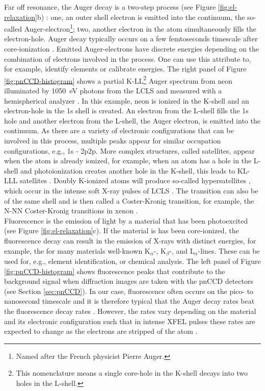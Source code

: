 %
Far off resonance, the Auger decay is a two-step process (see Figure \ref{fig:el-relaxation}b) \cite{schmidt-1997}: one, an outer shell electron is emitted into the continuum, the so-called Auger-electron\footnote{Named after the French physicist Pierre Auger.}; two, another electron in the atom simultaneously fills the electron-hole. Auger decay typically occurs on a few femtoseconds timescale after core-ionization \citep{Buth-2003-JCP}. Emitted Auger-electrons have discrete energies depending on the combination of electrons involved in the process. One can use this attribute to, for example, identify elements or calibrate energies. The right panel of Figure \ref{fig:pnCCD-histogram} shows a partial K-LL\footnote{This nomenclature means a single core-hole in the K-shell decays into two holes in the L-shell.} Auger spectrum from neon illuminated by \SI{1050}{\electronvolt} photons from the LCLS and measured with a hemispherical analyzer \citep{Bucher-2014-Unpublished}. In this example, neon is ionized in the K-shell and an electron-hole in the 1s shell is created. An electron from the L-shell fills the 1s hole and another electron from the L-shell, the Auger electron, is emitted into the continuum. As there are a variety of electronic configurations that can be involved in this process, multiple peaks appear for similar occupation configurations, e.g., 1s - 2p2p. More complex structures, called satellites, appear when the atom is already ionized, for example, when an atom has a hole in the L-shell and photoionization creates another hole in the K-shell, this leads to KL-LLL satellites \cite{schmidt-1997}. Doubly K-ionized atoms will produce so-called hypersatellites \cite{Briand-1971-PRL}, which occur in the intense soft X-ray pulses of LCLS \cite{Young-2010-Nature,Berrah-2011-PNAS}. The transition can also be of the same shell and is then called a Coster-Kronig transition, for example, the N-NN Coster-Kronig transitions in xenon \cite{Coster-1935-Physica}.\\[1\baselineskip]
%
Fluorescence is the emission of light by a material that has been photoexcited (see Figure \ref{fig:el-relaxation}c). If the material is has been core-ionized, the fluorescence decay can result in the emission of X-rays with distinct energies, for example, the for many materials well-known K$_\alpha$-, K$_\beta$-, and L$_\alpha$-lines. These can be used for, e.g., element identification, or chemical analysis. The left panel of Figure \ref{fig:pnCCD-histogram} shows fluorescence peaks that contribute to the background signal when diffraction images are taken with the pnCCD detectors (see Section \ref{sec:pnCCD}). In our case, fluorescence often occurs on the pico- to nanosecond timescale \citep{Berezin-2011-ChemRev} and it is therefore typical that the Auger decay rates beat the fluorescence decay rates \cite{Young-2010-Nature}. However, the rates vary depending on the material and its electronic configuration such that in intense XFEL pulses these rates are expected to change as the electrons are stripped of the atom \cite{Ho-2014-PRL}.
